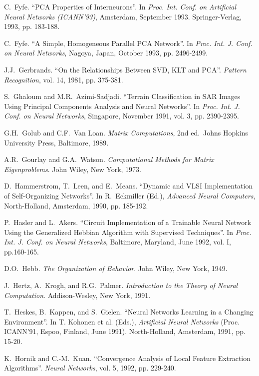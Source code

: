 \begin{thebibliography}{999}
C.~Fyfe.
``PCA Properties of Interneurons''.
In {\em Proc. Int. Conf. on Artificial Neural Networks (ICANN'93)},
Amsterdam, September 1993. Springer-Verlag, 1993, pp. 183-188.

C.~Fyfe.
``A Simple, Homogeneous Parallel PCA Network''.
In {\em Proc. Int. J. Conf. on Neural Networks}, Nagoya, Japan, October
1993, pp. 2496-2499.
 
J.J.~Gerbrands.
``On the Relationships Between SVD, KLT and PCA''.
{\em Pattern Recognition}, vol. 14, 1981, pp. 375-381.

S.~Ghaloum and M.R.~Azimi-Sadjadi.
``Terrain Classification in SAR Images Using Principal Components
Analysis and Neural Networks''.
In {\em Proc. Int. J. Conf. on Neural Networks}, Singapore, November 1991,
vol. 3, pp. 2390-2395. 

G.H.~Golub and C.F.~Van Loan.
{\em Matrix Computations}, 2nd ed.\
Johns Hopkins University Press, Baltimore, 1989.
 
A.R.~Gourlay and G.A.~Watson.
{\em Computational Methods for Matrix Eigenproblems}.
John Wiley, New York, 1973.
 
D.~Hammerstrom, T.~Leen, and E.~Means.
``Dynamic and VLSI Implementation of Self-Organizing Networks''.
In R.~Eckmiller (Ed.), {\em Advanced Neural Computers},
North-Holland, Amsterdam, 1990, pp. 185-192.

P.~Hasler and L.~Akers.
``Circuit Implementation of a Trainable Neural Network Using the Generalized
Hebbian Algorithm with Supervised Techniques''.
In {\em Proc. Int. J. Conf. on Neural Networks}, Baltimore, Maryland,
June 1992, vol. I, pp.160-165.

D.O.~Hebb.
{\em The Organization of Behavior}.
John Wiley, New York, 1949.

J.~Hertz, A.~Krogh, and R.G.~Palmer.
{\em Introduction to the Theory of Neural Computation}.
Addison-Wesley, New York, 1991.

T.~Heskes, B.~Kappen, and S.~Gielen.
``Neural Networks Learning in a Changing Environment''.
In T. Kohonen et al. (Eds.), {\em Artificial Neural Networks}
(Proc. ICANN'91, Espoo, Finland, June 1991).
North-Holland, Amsterdam, 1991, pp. 15-20.
 
K.~Hornik and C.-M.~Kuan.
``Convergence Analysis of Local Feature Extraction Algorithms''.
{\em Neural Networks}, vol. 5, 1992, pp. 229-240.


\end{thebibliography}
